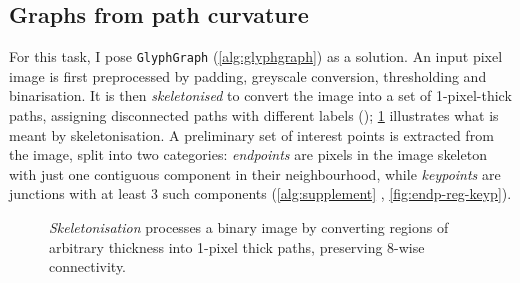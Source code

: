 \documentclass{mpaper}
\begin{document}
\subsection{Graphs from path curvature}
For this task, I pose \texttt{GlyphGraph} (\cref{alg:glyphgraph}) as a solution.
An input pixel image is first preprocessed by padding, greyscale conversion, thresholding and binarisation.
It is then \emph{skeletonised} to convert the image into a set of 1-pixel-thick paths, assigning disconnected paths with different labels (); \cref{fig:skel} illustrates what is meant by skeletonisation.
A preliminary set of interest points is extracted from the image, split into two categories: \emph{endpoints} are pixels in the image skeleton with just one contiguous component in their neighbourhood, while \emph{keypoints} are junctions with at least 3 such components (\cref{alg:supplement} , \cref{fig:endp-reg-keyp}).

\begin{figure}
	\centering
	
	\vspace{0.5em}
	\caption{
		\emph{Skeletonisation} processes a binary image by converting regions of arbitrary thickness into 1-pixel thick paths, preserving 8-wise connectivity.
		\label{fig:skel}
	}
\end{figure}
\end{document}
